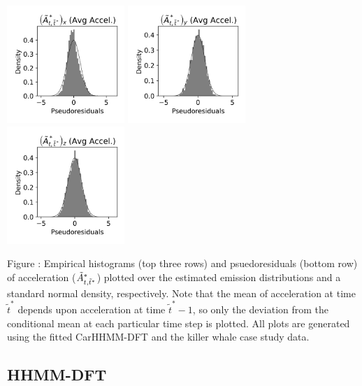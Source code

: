 \documentclass{article}
\begin{document}
\begin{center}
        \includegraphics[width=1.75in]{../Plots/2019/20190902-182840-CATs_OB_1_0_267_CarHHMM2_pseudresids_Ax.png}
        \includegraphics[width=1.75in]{../Plots/2019/20190902-182840-CATs_OB_1_0_267_CarHHMM2_pseudresids_Ay.png}
        \includegraphics[width=1.75in]{../Plots/2019/20190902-182840-CATs_OB_1_0_267_CarHHMM2_pseudresids_Az.png}
        \end{center}
        
        \noindent Figure : Empirical histograms (top three rows) and psuedoresiduals (bottom row) of acceleration ($\tilde{A}^*_{t,\tilde t^*}$) plotted over the estimated emission distributions and a standard normal density, respectively. Note that the mean of acceleration at time $\tilde t^*$ depends upon acceleration at time $\tilde t^*-1$, so only the deviation from the conditional mean at each particular time step is plotted. All plots are generated using the fitted CarHHMM-DFT and the killer whale case study data.
        \addtocounter{fignum}{1}
        
        \newpage
        
        \subsection{HHMM-DFT}
        
\end{document}
